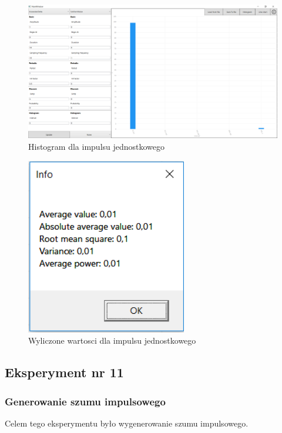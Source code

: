 \documentclass[12pt]{article}
\begin{document}
\begin{figure}[H]
 \centering
 \includegraphics[width=14cm]{images/kron1hist.PNG}
 \vspace{-0.3cm}
 \caption{Histogram dla impulsu jednostkowego}
 \label{gui}
\end{figure}

\begin{figure}[H]
 \centering
 \includegraphics[width=7cm]{images/kron1info.PNG}
 \vspace{-0.3cm}
 \caption{Wyliczone wartosci dla impulsu jednostkowego}
 \label{gui}
\end{figure}



\subsection{Eksperyment nr 11 }
\subsubsection{Generowanie szumu impulsowego}
Celem tego eksperymentu było wygenerowanie szumu impulsowego.
\end{document}

